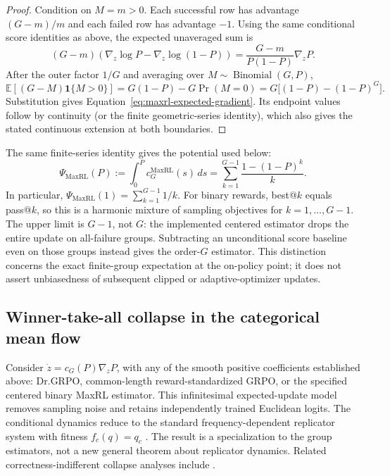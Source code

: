 \documentclass{article}
\newcommand{\1}{\mathbf 1}
\newcommand{\E}{\mathbb E}
\theoremstyle{remark}
\theoremstyle{definition}
\theoremstyle{plain}
\begin{document}
\begin{proof}
Condition on $M=m>0$. Each successful row has advantage $(G-m)/m$ and each
failed row has advantage $-1$. Using the same conditional score identities as
above, the expected unaveraged sum is
\[
  (G-m)\!\left(\nabla_z\log P-\nabla_z\log(1-P)\right)
  =\frac{G-m}{P(1-P)}\nabla_zP.
\]
After the outer factor $1/G$ and averaging over
$M\sim\operatorname{Binomial}(G,P)$,
\[
 \E[(G-M)\1\{M>0\}]
 =G(1-P)-G\Pr(M=0)
 =G\big[(1-P)-(1-P)^G\big].
\]
Substitution gives Equation~\eqref{eq:maxrl-expected-gradient}. Its endpoint
values follow by continuity (or the finite geometric-series identity), which
also gives the stated continuous extension at both boundaries.
\end{proof}

The same finite-series identity gives the potential used below:
\begin{equation}
 \Psi_{\mathrm{MaxRL}}(P)
 :=\int_0^P c_G^{\mathrm{MaxRL}}(s)\,ds
 =\sum_{k=1}^{G-1}\frac{1-(1-P)^k}{k}.
 \label{eq:maxrl-potential-finite-sum}
\end{equation}
In particular, $\Psi_{\mathrm{MaxRL}}(1)=\sum_{k=1}^{G-1}1/k$.
For binary rewards, best@\(k\) equals pass@\(k\), so this is a harmonic
mixture of sampling objectives for $k=1,\ldots,G-1$. The upper limit is
$G-1$, not $G$: the implemented centered estimator drops the entire update
on all-failure groups. Subtracting an unconditional score baseline even on
those groups instead gives the order-$G$ estimator. This distinction concerns
the exact finite-group expectation at the on-policy point; it does not assert
unbiasedness of subsequent clipped or adaptive-optimizer updates.


\subsection{Winner-take-all collapse in the categorical mean flow}
\label{app:theory-collapse}

Consider $\dot z=c_G(P)\nabla_zP$, with any of the smooth positive
coefficients established above: Dr.GRPO, common-length reward-standardized
GRPO, or the specified centered binary MaxRL estimator. This infinitesimal
expected-update model removes
sampling noise and retains independently trained Euclidean logits. The
conditional dynamics reduce to the standard frequency-dependent replicator
system with fitness $f_c(q)=q_c$ \citep{hofbauer1998evolutionary}. The result is
a specialization to the group estimators, not a new general theorem about
replicator dynamics. Related correctness-indifferent collapse analyses include
\citet{sinha2026expected,lochab2026ucpo}.
\end{document}
